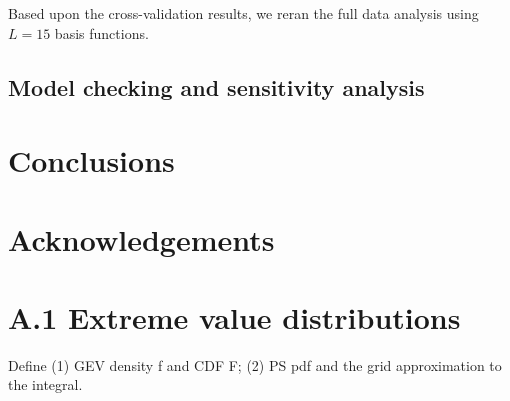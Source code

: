 \documentclass[11pt]{article}
\begin{document}
Based upon the cross-validation results, we reran the full data analysis using $L = 15$ basis functions.



\subsection{Model checking and sensitivity analysis}


\section{Conclusions}\label{s:con}

\section*{Acknowledgements}

\section*{A.1 Extreme value distributions}
Define (1) GEV density f and CDF F; (2) PS pdf  and the grid approximation to the integral.

\begin{singlespace}


\end{singlespace}
\end{document}
